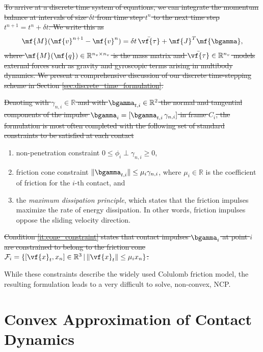 \sout{To arrive at a discrete time system of equations, we can integrate the momentum
balance at intervals of size $\delta t$ from time step $t^n$ to the next time
step $t^{n+1}=t^n+\delta t$. We write this as}
\begin{eqnarray}
	\mf{M}(\mf{v}^{n+1}-\mf{v}^n)  = \delta t\,\bar{\vf{\tau}} +
	\mf{J}^T\mf{\bgamma},
	\label{eq:momentum_balance}
\end{eqnarray}
\sout{where $\mf{M}(\mf{q})\in\mathbb{R}^{n_v\times n_v}$ is the mass matrix and
$\bar{\vf{\tau}}\in\mathbb{R}^{n_v}$ models external forces such as gravity and
gyroscopic terms arising in multibody dynamics. We present a comprehensive
discussion of our discrete time-stepping scheme in Section
\ref{sec:discrete_time_formulation}.}

\sout{Denoting with $\gamma_{n,i} \in \mathbb{R}$ and with $\bgamma_{t,i} \in
\mathbb{R}^2$ the normal and tangential components of the impulse
$\bgamma_i=[\bgamma_{t,i}\,\gamma_{n,i}]$ in frame $C_i$, the formulation is
most often completed with the following set of standard constraints to be
satisfied at each contact}
\begin{enumerate}
	\item non-penetration constraint $0\le\phi_i\perp\gamma_{n,i}\ge0$,
	\item\label{it:cone_constraint} friction cone constraint
	$\Vert\bgamma_{t,i}\Vert\le \mu_i\gamma_{n,i}$, where $\mu_i \in \mathbb{R}$
	is the coefficient of friction for the $i\text{-th}$ contact, and
	\item the \emph{maximum dissipation principle}, which states that the
	friction impulses maximize the rate of energy dissipation. In other words,
	friction impulses oppose the sliding velocity direction.
\end{enumerate}
\sout{Condition \ref{it:cone_constraint} states that contact impulses $\bgamma_i$ at
point $i$ are constrained to belong to the friction cone
$\mathcal{F}_i=\{[\vf{x}_t, x_n] \in\mathbb{R}^3 \,|\, \Vert\vf{x}_t\Vert\le
\mu_i x_n\}$.}

While these constraints describe the widely used Colulomb friction model, the
resulting formulation leads to a very difficult to solve, non-convex, NCP.

\section{Convex Approximation of Contact Dynamics}
\label{sec:previous_work}

